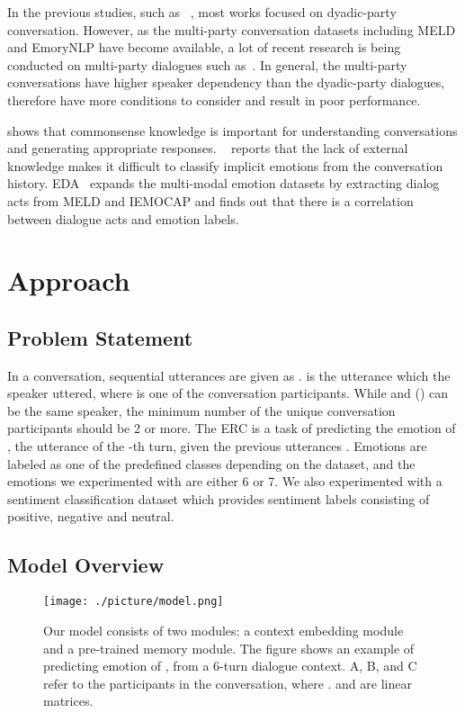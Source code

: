 \documentclass[11pt]{article}
\begin{document}
In the previous studies, such as ~\citet{hazarika-etal-2018-conversational, zadeh-etal-2017-tensor, DialogueRNN}, most works focused on dyadic-party conversation. However, as the multi-party conversation datasets including MELD and EmoryNLP have become available, a lot of recent research is being conducted on multi-party dialogues such as~\citet{ijcai2019-752, JiaoLK20, ghosal-etal-2020-cosmic}. In general, the multi-party conversations have higher speaker dependency than the dyadic-party dialogues, therefore have more conditions to consider and result in poor performance.


\citet{ijcai2018-643, ijcai2018-639} shows that commonsense knowledge is important for understanding conversations and generating appropriate responses. ~\citet{liu2020towards} reports that the lack of external knowledge makes it difficult to classify implicit emotions from the conversation history. EDA~\cite{bothe-etal-2020-eda} expands the multi-modal emotion datasets by extracting dialog acts from MELD and IEMOCAP and finds out that there is a correlation between dialogue acts and emotion labels.


\section{Approach}

\subsection{Problem Statement}
\label{problem-Statement}
In a conversation,  sequential utterances are given as .  is the utterance which the speaker  uttered, where  is one of the conversation participants. While  and  () can be the same speaker, the minimum number of the unique conversation participants should be 2 or more. The ERC is a task of predicting the emotion  of , the utterance of the -th turn, given the previous utterances . Emotions are labeled as one of the predefined classes depending on the dataset, and the emotions we experimented with are either 6 or 7. We also experimented with a sentiment classification dataset which provides sentiment labels consisting of positive, negative and neutral.


\subsection{Model Overview}
\label{model-overivew}
\begin{figure*}[!t]
    \centering 
    \texttt{[image: ./picture/model.png]}
    \caption{Our model consists of two modules: a context embedding module and a pre-trained memory module. The figure shows an example of predicting emotion of , from a 6-turn dialogue context. A, B, and C refer to the participants in the conversation, where .  and  are linear matrices.}
    \label{fig:Model}
\end{figure*}
\end{document}
